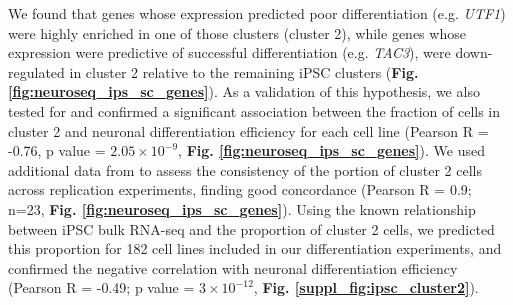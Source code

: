 We found that genes whose expression predicted poor differentiation (e.g. \textit{UTF1}) were highly enriched in one of those clusters (cluster 2), while genes whose expression were predictive of successful differentiation (e.g. \textit{TAC3}), were down-regulated in cluster 2 relative to the remaining iPSC clusters (\textbf{Fig. \ref{fig:neuroseq_ips_sc_genes}}). 
As a validation of this hypothesis, we also tested for and confirmed a significant association between the fraction of cells in cluster 2 and neuronal differentiation efficiency for each cell line (Pearson R = -0.76, p value = $2.05 \times 10^{-9}$, \textbf{Fig. \ref{fig:neuroseq_ips_sc_genes}}). 
We used additional data from \cite{cuomo2020single} to assess the consistency of the portion of cluster 2 cells across replication experiments, finding good concordance (Pearson R = 0.9; n=23, \textbf{Fig. \ref{fig:neuroseq_ips_sc_genes}}).
Using the known relationship between iPSC bulk RNA-seq and the proportion of cluster 2 cells, we predicted this proportion for 182 cell lines included in our differentiation experiments, and confirmed the negative correlation with neuronal differentiation efficiency (Pearson R = -0.49; p value = $3 \times 10^{-12}$, \textbf{Fig. \ref{suppl_fig:ipsc_cluster2}}). 
\\


